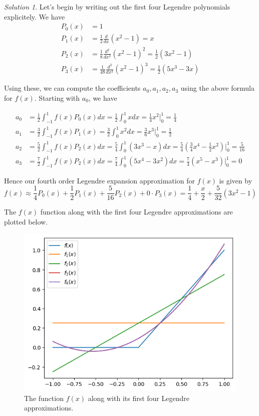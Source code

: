 \documentclass[12pt,a4paper]{article}
\theoremstyle{definition}
\theoremstyle{remark}
\newtheorem*{solution}{Solution}
\begin{document}
\begin{solution}
    Let's begin by writing out the first four Legendre polynomials explicitely. We have \begin{align*}
        P_0(x) &= 1 \\
        P_1(x) &= \frac{1}{2} \frac{d}{dx} (x^2-1) = x\\
        P_2(x) &= \frac{1}{8} \frac{d^2}{dx^2} (x^2-1)^2 = \frac{1}{2}(3x^2-1) \\
        P_3(x) &= \frac{1}{48} \frac{d^3}{dx^3} (x^2-1)^3 = \frac{1}{2} (5x^3 - 3x)
    \end{align*}

    Using these, we can compute the coefficients $a_0, a_1, a_2, a_3$ using the above formula for $f(x)$. Starting with $a_0$, we have

    \begin{align*}
        a_0 &= \frac{1}{2} \int_{-1}^1 f(x) P_0(x) dx = \frac{1}{2} \int_{0}^1 x dx = \frac{1}{4} x^2 \Bigg|_{0}^1 = \frac{1}{4} \\
        a_1 &= \frac{3}{2} \int_{-1}^1 f(x) P_1(x) = \frac{3}{2} \int_0^1 x^2 dx = \frac{3}{6} x^3 \Bigg|_0^1 = \frac{1}{2} \\
        a_2 &= \frac{5}{2} \int_{-1}^1 f(x) P_2(x) dx = \frac{5}{4} \int_0^1 (3x^3 - x) dx = \frac{5}{4} \left(\frac{3}{4} x^4 - \frac{1}{2} x^2\right) \Bigg|_0^1 = \frac{5}{16} \\
        a_3 &= \frac{7}{2} \int_{-1}^1 f(x) P_2(x) dx = \frac{7}{4} \int_0^1 (5x^4 - 3x^2) dx = \frac{7}{4} \left( x^5 - x^3 \right) \Bigg|_0^1 = 0
    \end{align*}

    Hence our fourth order Legendre expansion approximation for $f(x)$ is given by $$f(x) \approx \frac{1}{4} P_0(x) + \frac{1}{2} P_1(x) + \frac{5}{16} P_2(x) + 0 \cdot P_3(x) = \frac{1}{4} + \frac{x}{2} + \frac{5}{32} (3x^2-1)$$ 

    The $f(x)$ function along with the first four Legendre approximations are plotted below.

    \begin{figure}[h!]
        \centering
        \includegraphics{Legendre.png}
        \caption{The function $f(x)$ along with its first four Legendre approximations.}
    \end{figure}

\end{solution}
\end{document}
